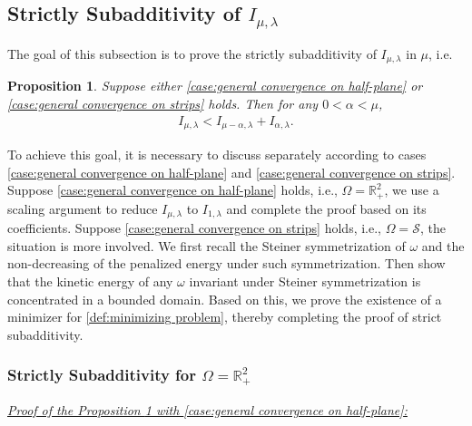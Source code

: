 \documentclass[11pt,letterpaper]{amsart}
\newtheorem{prop}[thm]{Proposition}
\theoremstyle{definition}
\theoremstyle{remark}
\renewcommand{\S}{\mathcal{S}}
\newcommand{\R}{\mathbb{R}}
\renewcommand{\O}{\Omega}
\numberwithin{equation}{section}
\begin{document}
\subsection{Strictly Subadditivity of $I_{\mu,\lambda}$}

The goal of this subsection is to prove the strictly subadditivity of $I_{\mu,\lambda}$ in $\mu$, i.e. 

\begin{prop}\label{prop:strictly subadditivity}
    Suppose either \ref{case:general convergence on half-plane} or \ref{case:general convergence on strips} holds. Then for any $0<\alpha<\mu$,
    \begin{align}
        I_{\mu,\lambda}<I_{\mu-\alpha,\lambda}+I_{\alpha,\lambda}. \label{ineq:strictly subadditivity}
    \end{align}
\end{prop}

To achieve this goal, it is necessary to discuss separately according to cases \ref{case:general convergence on half-plane} and \ref{case:general convergence on strips}. Suppose \ref{case:general convergence on half-plane} holds, i.e., $\O=\R^2_+$, we use a scaling argument to reduce $I_{\mu,\lambda}$ to $I_{1,\lambda}$ and complete the proof based on its coefficients. Suppose \ref{case:general convergence on strips} holds, i.e., $\O=\S$, the situation is more involved. We first recall the Steiner symmetrization of $\omega$ and the non-decreasing of the penalized energy under such symmetrization. Then show that the kinetic energy of any $\omega$ invariant under Steiner symmetrization is concentrated in a bounded domain. Based on this, we prove the existence of a minimizer for \eqref{def:minimizing problem}, thereby completing the proof of strict subadditivity.

\subsubsection{Strictly Subadditivity for $\O=\R^2_+$}\hfill

\noindent\underline{\textit{Proof of the Proposition \ref{prop:strictly subadditivity} with \ref{case:general convergence on half-plane}:}}
\end{document}
